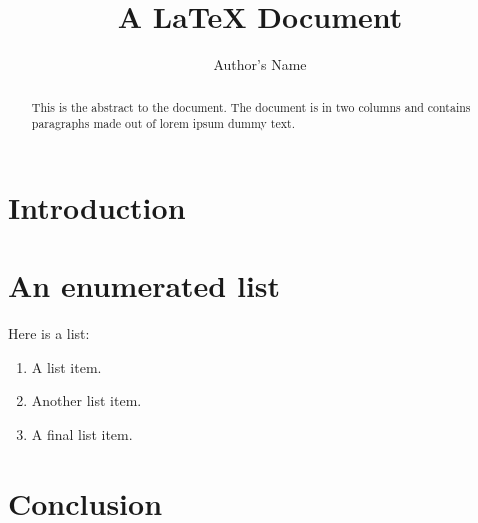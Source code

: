 \documentclass[a4paper,twocolumn]{article}
\title{A \LaTeX{} Document}
\author{Author's Name}
\begin{document}
\maketitle

\begin{abstract}
This is the abstract to the document. The document
is in two columns and contains paragraphs made out 
of lorem ipsum dummy text.
\end{abstract}

\section{Introduction}

\lipsum[1]

\section{An enumerated list}

Here is a list:

\begin{enumerate}
    \item A list item.
    \item Another list item.
    \item A final list item.
\end{enumerate}

\section{Conclusion}

\lipsum[2-4]
\end{document}
